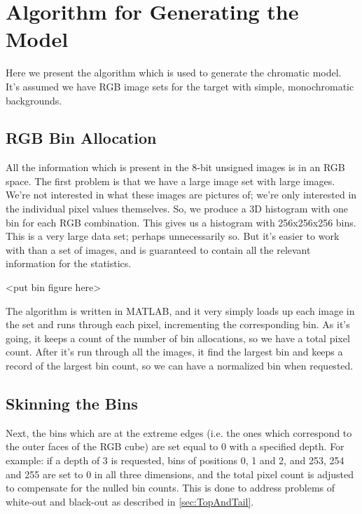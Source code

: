 \section{Algorithm for Generating the Model}\label{sec:AlgorithmForGeneratingModel}
Here we present the algorithm which is used to generate the chromatic model. It's assumed we have RGB image sets for the target with simple, monochromatic backgrounds.




\subsection{RGB Bin Allocation}\label{sec:RGBBinAllocation}
All the information which is present in the 8-bit unsigned images is in an RGB space. The first problem is that we have a large image set with large images. We're not interested in what these images are pictures of; we're only interested in the individual pixel values themselves. So, we produce a 3D histogram with one bin for each RGB combination. This gives us a histogram with 256x256x256 bins. This is a very large data set; perhaps unnecessarily so. But it's easier to work with than a set of images, and is guaranteed to contain all the relevant information for the statistics.

<put bin figure here>

The algorithm is written in MATLAB, and it very simply loads up each image in the set and runs through each pixel, incrementing the corresponding bin. As it's going, it keeps a count of the number of bin allocations, so we have a total pixel count. After it's run through all the images, it find the largest bin and keeps a record of the largest bin count, so we can have a normalized bin when requested.


\subsection{Skinning the Bins}\label{sec:SkinningTheBins}
Next, the bins which are at the extreme edges (i.e. the ones which correspond to the outer faces of the RGB cube) are set equal to 0 with a specified depth. For example: if a depth of 3 is requested, bins of positions 0, 1 and 2, and 253, 254 and 255 are set to 0 in all three dimensions, and the total pixel count is adjusted to compensate for the nulled bin counts. This is done to address problems of white-out and black-out as described in \ref{sec:TopAndTail}.

